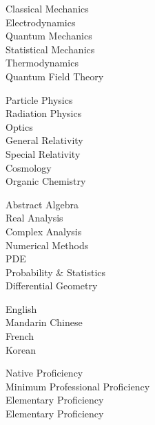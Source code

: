 \begin{minipage}[t]{0.8\textwidth}
	\vspace*{4pt}
	{
		\begin{minipage}[t]{0.30\textwidth}
			Classical Mechanics\\
			Electrodynamics\\
			Quantum Mechanics\\
			Statistical Mechanics\\
			Thermodynamics\\
			Quantum Field Theory
		\end{minipage}
		\begin{minipage}[t]{0.30\textwidth}
			Particle Physics\\
			Radiation Physics\\
			Optics\\
			General Relativity\\
			Special Relativity\\
			Cosmology\\
			Organic Chemistry
		\end{minipage}
		\begin{minipage}[t]{0.30\textwidth}
			Abstract Algebra\\
			Real Analysis\\
			Complex Analysis\\
			Numerical Methods\\
			PDE\\
			Probability \& Statistics\\
			Differential Geometry
		\end{minipage}
	}

	\vspace*{4pt}
	{
		\begin{minipage}[t]{0.40\textwidth}
			English\\
			Mandarin Chinese\\
			French\\
			Korean
		\end{minipage}
		\begin{minipage}[t]{0.50\textwidth}
			Native Proficiency\\
			Minimum Professional Proficiency\\
			Elementary Proficiency\\
			Elementary Proficiency
		\end{minipage}
	}
\end{minipage}

\vspace{8pt}

